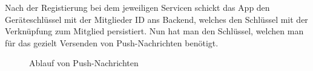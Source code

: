 Nach der Registierung bei dem jeweiligen Servicen schickt das App den Geräteschlüssel mit der Mitglieder ID ans Backend, welches den Schlüssel mit der Verknüpfung zum Mitglied persistiert. Nun hat man den Schlüssel, welchen man für das gezielt Versenden von Push-Nachrichten benötigt.
\begin{figure}[ht]
\centering
{}
\label{fig:app_settings}
\caption{Ablauf von Push-Nachrichten}
\end{figure}
